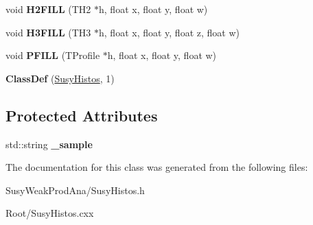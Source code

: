 \begin{DoxyCompactItemize}
\item 
\hypertarget{classSusyHistos_a73918b21a7554ce92d52cf8fa31e49c2}{
void {\bfseries H2FILL} (TH2 $\ast$h, float x, float y, float w)}
\label{classSusyHistos_a73918b21a7554ce92d52cf8fa31e49c2}

\item 
\hypertarget{classSusyHistos_affc2c9d32da336b5f016462792563360}{
void {\bfseries H3FILL} (TH3 $\ast$h, float x, float y, float z, float w)}
\label{classSusyHistos_affc2c9d32da336b5f016462792563360}

\item 
\hypertarget{classSusyHistos_a3acdbde14228a0bd7cde3380bd26f97a}{
void {\bfseries PFILL} (TProfile $\ast$h, float x, float y, float w)}
\label{classSusyHistos_a3acdbde14228a0bd7cde3380bd26f97a}

\item 
\hypertarget{classSusyHistos_a382e85f04c0f57fe9e56d5eaaf1c9c38}{
{\bfseries ClassDef} (\hyperlink{classSusyHistos}{SusyHistos}, 1)}
\label{classSusyHistos_a382e85f04c0f57fe9e56d5eaaf1c9c38}

\end{DoxyCompactItemize}
\subsection*{Protected Attributes}
\begin{DoxyCompactItemize}
\item 
\hypertarget{classSusyHistos_a14b8564370673ac0c569237a9416aa42}{
std::string {\bfseries \_\-sample}}
\label{classSusyHistos_a14b8564370673ac0c569237a9416aa42}

\end{DoxyCompactItemize}


The documentation for this class was generated from the following files:\begin{DoxyCompactItemize}
\item 
SusyWeakProdAna/SusyHistos.h\item 
Root/SusyHistos.cxx\end{DoxyCompactItemize}
